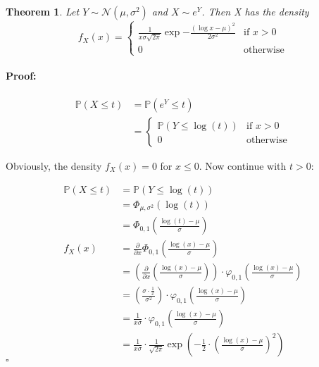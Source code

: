 \documentclass[a4paper]{scrartcl}
\newtheorem{theorem}{Theorem}
\newenvironment{proof}{\paragraph{Proof:}}{\hfill$\square$}
\newcommand{\Prob}{\mathbb{P}}
\begin{document}
    \begin{theorem}
    Let $Y \sim \mathcal{N}(\mu, \sigma^2)$ and $X \sim e^Y$.
    Then X has the density
    \[f_X(x) = \begin{cases} \frac{1}{x \sigma \sqrt{2 \pi}}\exp{- \frac{(\log x - \mu)^2}{2 \sigma^2}} &\text{if } x > 0\\
                             0 & \text{otherwise}\end{cases}\]
    \end{theorem}


    \begin{proof}
    \begin{align}
        \Prob(X \leq t) &= \Prob(e^Y \leq t)\\
                        &= \begin{cases}\Prob(Y \leq \log(t)) &\text{if } x > 0\\
                                        0 &\text{otherwise}
                           \end{cases}
    \end{align}

    Obviously, the density $f_X(x) = 0$ for $x \leq 0$. Now continue with
    $t > 0$:

    \begin{align}
        \Prob(X \leq t) &= \Prob(Y \leq \log(t))\\
                        &= \Phi_{\mu, \sigma^2}(\log(t))\\
                        &= \Phi_{0, 1} \left (\frac{\log(t) - \mu}{\sigma} \right)\\
        f_X(x) &= \frac{\partial}{\partial x} \Phi_{0, 1} \left (\frac{\log(x) - \mu}{\sigma} \right)\\
               &= \left (\frac{\partial}{\partial x} \left (\frac{\log(x) - \mu}{\sigma} \right) \right) \cdot \varphi_{0, 1} \left (\frac{\log(x) - \mu}{\sigma} \right)\\
               &= \left (\frac{\sigma \cdot \frac{1}{x}}{\sigma^2} \right) \cdot \varphi_{0, 1} \left (\frac{\log(x) - \mu}{\sigma} \right)\\
               &= \frac{1}{x \sigma} \cdot \varphi_{0, 1} \left (\frac{\log(x) - \mu}{\sigma} \right)\\
               &= \frac{1}{x \sigma} \cdot \frac{1}{\sqrt{2\pi}} \exp \left (-\frac{1}{2} \cdot {\left(\frac{\log(x) - \mu}{\sigma} \right )}^2 \right )
    \end{align}
    \end{proof}
\end{document}
